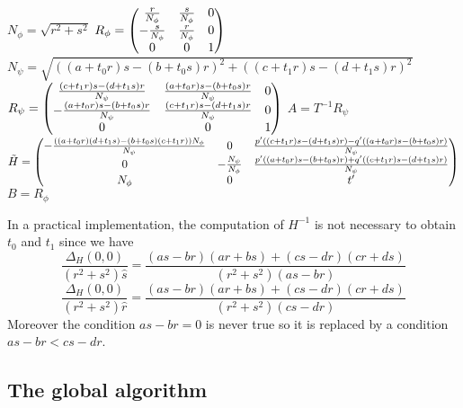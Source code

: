    \begin{algorithme}
     \label{pseudoCodeDecompo}
     \caption{$decomposition(H)$}
     $N_\phi = \sqrt{r^2+s^2}$\;
     $R_\phi = \begin{pmatrix} 
      \frac{r}{N_\phi} & \frac{s}{N_\phi} & 0\\
      -\frac{s}{N_\phi} & \frac{r}{N_\phi} & 0\\
      0 & 0 & 1 \end{pmatrix}$\;
     $N_\psi = \sqrt{((a+t_0r)s-(b+t_0s)r)^2+((c+t_1r)s-(d+t_1s)r)^2}$\;
     $R_\psi = \begin{pmatrix} 
      \frac{(c+t_1r)s-(d+t_1s)r}{N_\psi} & \frac{(a+t_0r)s-(b+t_0s)r}{N_\psi} & 0\\
      -\frac{(a+t_0r)s-(b+t_0s)r}{N_\psi} & \frac{(c+t_1r)s-(d+t_1s)r}{N_\psi} & 0\\
      0 & 0 & 1 \end{pmatrix}$\;
     $A = T^{-1}R_\psi$\;
     $\tilde H = \begin{pmatrix} 
      -\frac{((a+t_0r)(d+t_1s)-(b+t_0s)(c+t_1r))N_\phi}{N_\psi} & 0 & \frac{p'((c+t_1r)s-(d+t_1s)r)-q'((a+t_0r)s-(b+t_0s)r)}{N_\psi}\\
      0 & -\frac{N_\psi}{N_\phi} & \frac{p'((a+t_0r)s-(b+t_0s)r)+q'((c+t_1r)s-(d+t_1s)r)}{N_\psi}\\
      N_\phi & 0 & t' \end{pmatrix}$\;
     $B = R_\phi$\;
   \end{algorithme}
   
   In a practical implementation, the computation of $H^{-1}$ is not necessary to obtain $t_0$ and $t_1$ since we have
   \[\frac{\Delta_H(0,0)}{(r^2+s^2)\hat s} = \frac{(as-br)(ar+bs)+(cs-dr)(cr+ds)}{(r^2+s^2)(as-br)}\]
 \[\frac{\Delta_H(0,0)}{(r^2+s^2)\hat r} = \frac{(as-br)(ar+bs)+(cs-dr)(cr+ds)}{(r^2+s^2)(cs-dr)}\]
Moreover the condition $as-br=0$ is never true so it is replaced by a condition $as-br<cs-dr$.
   

\subsection{The global algorithm}
 \label{translainsta}
 
